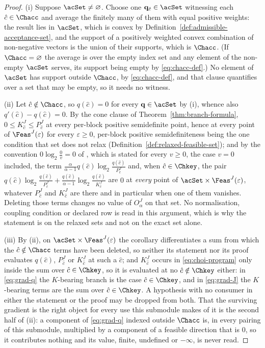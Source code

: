 \begin{proof}
(i) Suppose $\acSet\neq\varnothing$. Choose one
$\mathbf q_{\hat c}\in\acSet$ witnessing each
$\hat c\in\Chacc$ and average the finitely many of them with equal
positive weights: the result lies in $\acSet$, which is convex by
Definition~\ref{def:admissible-acceptance-set}, and the support of a positively weighted convex
combination of non-negative vectors is the union of their supports, which
is $\Chacc$. (If $\Chacc=\varnothing$ the average is over the empty index
set and any element of the non-empty $\acSet$ serves, its support being
empty by \eqref{eq:chacc-def}.) No element of $\acSet$ has support outside
$\Chacc$, by \eqref{eq:chacc-def}, and that clause quantifies over a set
that may be empty, so it needs no witness.

(ii) Let $\hat c\notin\Chacc$, so $q(\hat c)=0$ for every
$\mathbf q\in\acSet$ by (i), whence also $q'(\hat c)-q(\hat c)=0$. By
the cone clause of Theorem~\ref{thm:branch-formula},
$0\le K^{J}_{\hat c}\le P^{J}_{\hat c}$ at every per-block positive
semidefinite point, hence at every point of $\Feas^{J}(\varepsilon)$ for
every $\varepsilon\ge0$, per-block positive semidefiniteness being the
one condition that set does not relax
(Definition~\ref{def:relaxed-feasible-set}); and by the convention
$0\log_2\frac0v=0$ of , which is stated for every
$v\ge0$, the case $v=0$ included, the term
$\frac{\alpha}{\alpha-1}q(\hat c)\log_2\frac{q(\hat c)}{P^{J}_{\hat c}}$
and, when $\hat c\in\Chkey$, the pair
$q(\hat c)\log_2\frac{q(\hat c)}{P^{J}_{\hat c}}
+\frac{q(\hat c)}{\alpha-1}\log_2\frac{q(\hat c)}{K^{J}_{\hat c}}$
are $0$ at \emph{every} point of $\acSet\times\Feas^{J}(\varepsilon)$,
whatever $P^{J}_{\hat c}$ and $K^{J}_{\hat c}$ are there and in particular
when one of them vanishes. Deleting those terms changes no value of
$O^{J}_{\alpha}$ on that set. No normalisation, coupling condition or
declared row is read in this argument, which is why the statement is on
the relaxed sets and not on the exact set alone.

(iii) By (ii), on $\acSet\times\Feas^{J}(\varepsilon)$ the corollary
differentiates a sum from which the $\hat c\notin\Chacc$ terms have been
deleted, so neither its statement nor its proof evaluates $q(\hat c)$,
$P^{J}_{\hat c}$ or $K^{J}_{\hat c}$ at such a $\hat c$; and
$K^{J}_{\hat c}$ occurs in \eqref{eq:choi-program} only inside the sum
over $\hat c\in\Chkey$, so it is evaluated at no $\hat c\notin\Chkey$
either: in \eqref{eq:grad-q} the $K$-bearing branch is the case
$\hat c\in\Chkey$, and in \eqref{eq:grad-J} the $K$-bearing terms are the
sum over $\hat c\in\Chkey$. A hypothesis with no consumer in either the
statement or the proof may be dropped from both. That the surviving
gradient is the right object for every use this submodule makes of it is
the second half of (ii): a component of \eqref{eq:grad-q} indexed outside
$\Chacc$ is, in every pairing of this submodule, multiplied by a component
of a feasible direction that is $0$, so it contributes nothing and its
value, finite, undefined or $-\infty$, is never read.
\end{proof}

